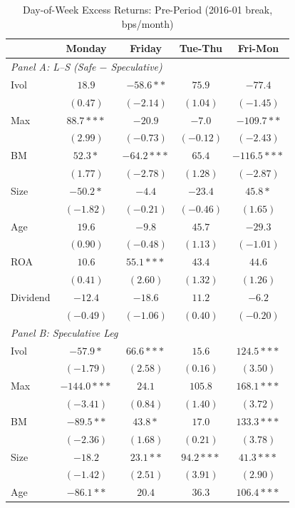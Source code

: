 \begin{table}[htbp]
\centering
\caption{Day-of-Week Excess Returns: Pre-Period (2016-01 break, bps/month)}
\label{tab:split_201601_pre}
\footnotesize
\begin{tabular}{l c c c c}
\toprule
 & Monday & Friday & Tue-Thu & Fri-Mon \\
\midrule
\multicolumn{5}{l}{\textit{Panel A: L--S (Safe $-$ Speculative)}} \\
Ivol & $18.9$ & $-58.6**$ & $75.9$ & $-77.4$ \\
 & $(0.47)$ & $(-2.14)$ & $(1.04)$ & $(-1.45)$ \\
Max & $88.7***$ & $-20.9$ & $-7.0$ & $-109.7**$ \\
 & $(2.99)$ & $(-0.73)$ & $(-0.12)$ & $(-2.43)$ \\
BM & $52.3*$ & $-64.2***$ & $65.4$ & $-116.5***$ \\
 & $(1.77)$ & $(-2.78)$ & $(1.28)$ & $(-2.87)$ \\
Size & $-50.2*$ & $-4.4$ & $-23.4$ & $45.8*$ \\
 & $(-1.82)$ & $(-0.21)$ & $(-0.46)$ & $(1.65)$ \\
Age & $19.6$ & $-9.8$ & $45.7$ & $-29.3$ \\
 & $(0.90)$ & $(-0.48)$ & $(1.13)$ & $(-1.01)$ \\
ROA & $10.6$ & $55.1***$ & $43.4$ & $44.6$ \\
 & $(0.41)$ & $(2.60)$ & $(1.32)$ & $(1.26)$ \\
Dividend & $-12.4$ & $-18.6$ & $11.2$ & $-6.2$ \\
 & $(-0.49)$ & $(-1.06)$ & $(0.40)$ & $(-0.20)$ \\
\midrule
\multicolumn{5}{l}{\textit{Panel B: Speculative Leg}} \\
Ivol & $-57.9*$ & $66.6***$ & $15.6$ & $124.5***$ \\
 & $(-1.79)$ & $(2.58)$ & $(0.16)$ & $(3.50)$ \\
Max & $-144.0***$ & $24.1$ & $105.8$ & $168.1***$ \\
 & $(-3.41)$ & $(0.84)$ & $(1.40)$ & $(3.72)$ \\
BM & $-89.5**$ & $43.8*$ & $17.0$ & $133.3***$ \\
 & $(-2.36)$ & $(1.68)$ & $(0.21)$ & $(3.78)$ \\
Size & $-18.2$ & $23.1**$ & $94.2***$ & $41.3***$ \\
 & $(-1.42)$ & $(2.51)$ & $(3.91)$ & $(2.90)$ \\
Age & $-86.1**$ & $20.4$ & $36.3$ & $106.4***$ \\

\end{tabular}
\end{table}
